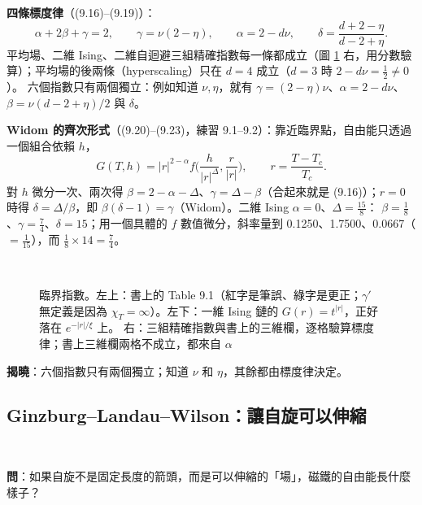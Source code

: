 \textbf{四條標度律}（(9.16)--(9.19)）：
\[\alpha+2\beta+\gamma=2,\qquad\gamma=\nu(2-\eta),\qquad\alpha=2-d\nu,\qquad\delta=\frac{d+2-\eta}{d-2+\eta}.\tag{9.16--9.19}\]
平均場、二維 Ising、二維自迴避三組精確指數每一條都成立（圖 \ref{nine-fig-exp} 右，用分數驗算）；平均場的後兩條（hyperscaling）只在 $d=4$ 成立（$d=3$ 時 $2-d\nu=\frac12\ne0$）。
六個指數只有兩個獨立：例如知道 $\nu,\eta$，就有 $\gamma=(2-\eta)\nu$、$\alpha=2-d\nu$、$\beta=\nu(d-2+\eta)/2$ 與 $\delta$。

\textbf{Widom 的齊次形式}（(9.20)--(9.23)，練習 9.1--9.2）：靠近臨界點，自由能只透過一個組合依賴 $h$，
\[G(T,h)=|r|^{2-\alpha}f\Big(\frac h{|r|^\Delta},\frac r{|r|}\Big),\qquad r=\frac{T-T_c}{T_c}.\tag{9.21, 9.23}\]
對 $h$ 微分一次、兩次得 $\beta=2-\alpha-\Delta$、$\gamma=\Delta-\beta$（合起來就是 (9.16)）；$r=0$ 時得 $\delta=\Delta/\beta$，即 $\beta(\delta-1)=\gamma$（Widom）。二維 Ising $\alpha=0$、$\Delta=\frac{15}8$：
$\beta=\frac18$、$\gamma=\frac74$、$\delta=15$；用一個具體的 $f$ 數值微分，斜率量到 0.1250、1.7500、0.0667（$=\frac1{15}$），而 $\frac18\times14=\frac74$。

\begin{figure}[htbp]
\centering
\begin{minipage}[c]{0.5\linewidth}\centering\footnotesize\setlength{\tabcolsep}{2pt}\NineTabNineOne\\[8pt]\NineFigChain\end{minipage}\hfill
\begin{minipage}[c]{0.48\linewidth}\centering\footnotesize\setlength{\tabcolsep}{2.2pt}\NineTabLaws\end{minipage}
\caption{臨界指數。左上：書上的 Table 9.1（紅字是筆誤、綠字是更正；$\gamma'$ 無定義是因為 $\chi_T=\infty$）。左下：一維 Ising 鏈的 $G(r)=t^{|r|}$，正好落在 $e^{-|r|/\xi}$ 上。
右：三組精確指數與書上的三維欄，逐格驗算標度律；書上三維欄兩格不成立，都來自 $\alpha$}\label{nine-fig-exp}
\end{figure}

\textbf{揭曉}：六個指數只有兩個獨立；知道 $\nu$ 和 $\eta$，其餘都由標度律決定。

\subsection{Ginzburg--Landau--Wilson：讓自旋可以伸縮}
\leavevmode{}\ \par\nopagebreak

\textbf{問}：如果自旋不是固定長度的箭頭，而是可以伸縮的「場」，磁鐵的自由能長什麼樣子？

